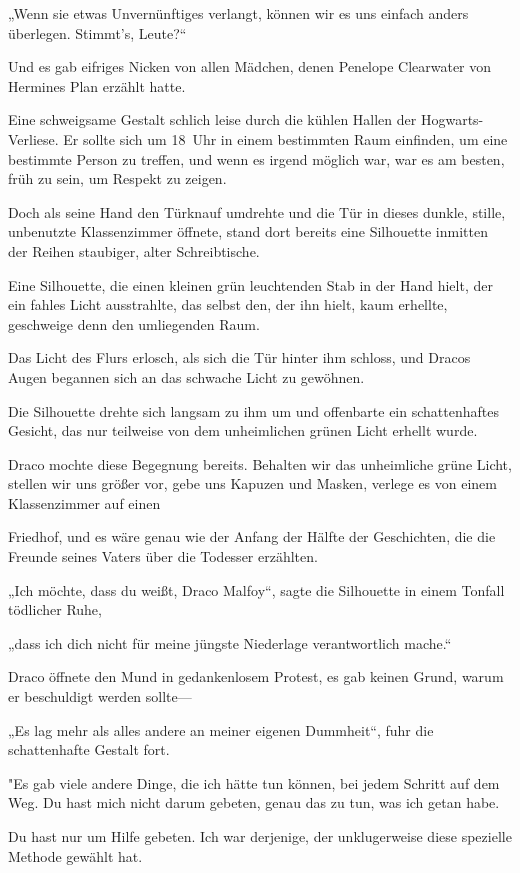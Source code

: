 {„Wenn sie etwas Unvernünftiges verlangt, können wir es uns einfach anders überlegen. Stimmt's, Leute?“

Und es gab eifriges Nicken von allen Mädchen, denen Penelope Clearwater von Hermines Plan erzählt hatte.

Eine schweigsame Gestalt schlich leise durch die kühlen Hallen der Hogwarts-Verliese. Er sollte sich um 18~Uhr in einem bestimmten Raum einfinden, um eine bestimmte Person zu treffen, und wenn es irgend möglich war, war es am besten, früh zu sein, um Respekt zu zeigen.

Doch als seine Hand den Türknauf umdrehte und die Tür in dieses dunkle, stille, unbenutzte Klassenzimmer öffnete, stand dort bereits eine Silhouette inmitten der Reihen staubiger, alter Schreibtische.

Eine Silhouette, die einen kleinen grün leuchtenden Stab in der Hand hielt, der ein fahles Licht ausstrahlte, das selbst den, der ihn hielt, kaum erhellte, geschweige denn den umliegenden Raum.

Das Licht des Flurs erlosch, als sich die Tür hinter ihm schloss, und Dracos Augen begannen sich an das schwache Licht zu gewöhnen.

Die Silhouette drehte sich langsam zu ihm um und offenbarte ein schattenhaftes Gesicht, das nur teilweise von dem unheimlichen grünen Licht erhellt wurde.

Draco mochte diese Begegnung bereits. Behalten wir das unheimliche grüne Licht, stellen wir uns größer vor, gebe uns Kapuzen und Masken, verlege es von einem Klassenzimmer auf einen

Friedhof, und es wäre genau wie der Anfang der Hälfte der Geschichten, die die Freunde seines Vaters über die Todesser erzählten.

„Ich möchte, dass du weißt, Draco Malfoy“, sagte die Silhouette in einem Tonfall tödlicher Ruhe,

„dass ich dich nicht für meine jüngste Niederlage verantwortlich mache.“

Draco öffnete den Mund in gedankenlosem Protest, es gab keinen Grund, warum er beschuldigt werden sollte—

„Es lag mehr als alles andere an meiner eigenen Dummheit“, fuhr die schattenhafte Gestalt fort.

"Es gab viele andere Dinge, die ich hätte tun können, bei jedem Schritt auf dem Weg. Du hast mich nicht darum gebeten, genau das zu tun, was ich getan habe.

Du hast nur um Hilfe gebeten. Ich war derjenige, der unklugerweise diese spezielle Methode gewählt hat.

}
